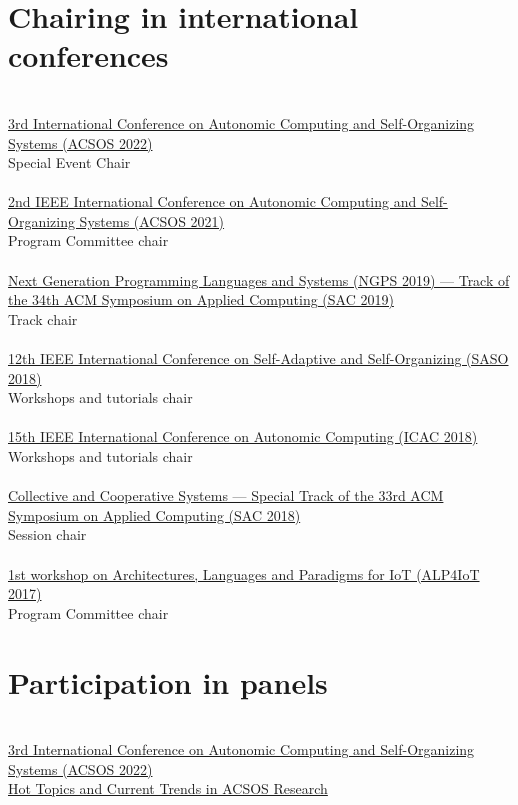 \section{{\color{black}Chairing in international conferences}}
\halfblankline \\
\href{https://conf.researchr.org/home/acsos-2022/}{3rd International Conference on Autonomic Computing and Self-Organizing Systems
(ACSOS 2022)}
\\ Special Event Chair \\
\halfblankline \\
\href{https://conf.researchr.org/home/acsos-2021}{2nd IEEE International Conference on Autonomic Computing and Self-Organizing Systems 
(ACSOS 2021)}
\\ Program Committee chair \\
\halfblankline \\
\href{https://ngps2019.github.io/}{Next Generation Programming Languages and Systems (NGPS 2019) --- 
Track of the 34th ACM Symposium on Applied Computing (SAC 2019)}
\\ Track chair \\
\halfblankline \\
\href{https://saso2018.fbk.eu/}{12th IEEE International Conference on Self-Adaptive and Self-Organizing (SASO 2018)}
\\ Workshops and tutorials chair \\
\halfblankline \\
\href{http://icac2018.informatik.uni-wuerzburg.de/committees/organization-committee/}{15th IEEE International Conference on Autonomic Computing (ICAC 2018)}
\\ Workshops and tutorials chair \\
\halfblankline \\
\href{http://sac-cas2018.apice.unibo.it/referees.html}{Collective and Cooperative Systems --- Special Track of the 33rd ACM Symposium on Applied Computing (SAC 2018)}
\\ Session chair \\
\halfblankline \\
\href{http://apice.unibo.it/xwiki/bin/view/ALP4IoT2016/WebHome}{1st workshop on Architectures, Languages and Paradigms for IoT (ALP4IoT 2017)}
\\ Program Committee chair \\

\section{{\color{black}Participation in panels}}
\halfblankline \\
\href{https://2022.acsos.org/details/acsos-2022-papers/36/Hot-Topics-and-Current-Trends-in-ACSOS-Research}{3rd International Conference on Autonomic Computing and Self-Organizing Systems
    (ACSOS 2022)}
\\ \href{https://danysk.github.io/Slides-2022-ACSOS-Panel/#/}{Hot Topics and Current Trends in ACSOS Research} \\

